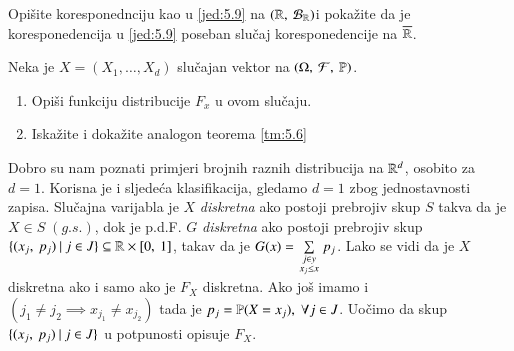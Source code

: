 \begin{zad} \label{zad:5.10}
    Opi\v site koresponednciju kao u \eqref{jed:5.9} na $({\mathbb{R}}, \: {\mathcal{B}_{\mathbb{R}}})$i poka\v zite da je koresponedencija u \eqref{jed:5.9} poseban slu\v caj koresponedencije na $\overline{\mathbb{R}}$.
\end{zad}

\begin{zad} \label{zad:5.11}
    Neka je $X = (X_1, \ldots, X_d)$ slu\v cajan vektor na $(\Omega, \: \mathcal{F}, \: \mathbb{P})$.
    \begin{enumerate}[label=(\alph*)]
        \item Opi\v si funkciju distribucije $F_x$ u ovom slu\v caju.
        \item Iska\v zite i doka\v zite analogon teorema \ref{tm:5.6}
    \end{enumerate}
\end{zad}

Dobro su nam poznati primjeri brojnih raznih distribucija na $\mathbb{R}^d$, osobito za $d = 1$.
Korisna je i sljede\' ca klasifikacija, gledamo $d = 1$ zbog jednostavnosti zapisa.
Slu\v cajna varijabla je $X$ \emph{diskretna} ako postoji prebrojiv skup $S$ takva da je $X \in S \; (g.s.)$, dok je p.d.F. $G$ \emph{diskretna} ako postoji prebrojiv skup $\{{({x_j}, \: {p_j})} \: | \: {j \in J}\} \subseteq \mathbb{R} \times [{0}, \:{1}]$, takav da je $G(x) = \sum\limits_{\begin{smallmatrix} j \in y\\ x_j \leq x \end{smallmatrix}}^{} p_j$.
Lako se vidi da je $X$ diskretna ako i samo ako je $F_X$ diskretna.
Ako jo\v s imamo i $(j_1 \neq j_2 \implies x_{j_1} \neq x_{j_2})$ tada je $p_j = \mathbb{P}({X = x_j}), \; \forall j \in J$.
Uo\v cimo da skup $\{{({x_j}, \: {p_j})} \: | \: {j \in J}\}$ u potpunosti opisuje $F_X$.

